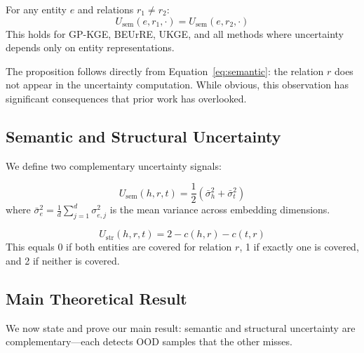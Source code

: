 \begin{proposition}
\label{prop:relation_agnostic}
For any entity $e$ and relations $r_1 \neq r_2$:
\begin{equation}
    U_{\text{sem}}(e, r_1, \cdot) = U_{\text{sem}}(e, r_2, \cdot)
\end{equation}
This holds for GP-KGE, BEUrRE, UKGE, and all methods where uncertainty depends only on entity representations.
\end{proposition}

The proposition follows directly from Equation~\ref{eq:semantic}: the relation $r$ does not appear in the uncertainty computation. While obvious, this observation has significant consequences that prior work has overlooked.

\subsection{Semantic and Structural Uncertainty}

We define two complementary uncertainty signals:

\begin{definition}
\begin{equation}
    U_{\text{sem}}(h,r,t) = \frac{1}{2}(\bar{\sigma}^2_h + \bar{\sigma}^2_t)
\end{equation}
where $\bar{\sigma}^2_e = \frac{1}{d}\sum_{j=1}^d \sigma^2_{e,j}$ is the mean variance across embedding dimensions.
\end{definition}

\begin{definition}
\begin{equation}
    U_{\text{str}}(h,r,t) = 2 - c(h,r) - c(t,r)
\end{equation}
This equals 0 if both entities are covered for relation $r$, 1 if exactly one is covered, and 2 if neither is covered.
\end{definition}

\subsection{Main Theoretical Result}

We now state and prove our main result: semantic and structural uncertainty are complementary---each detects OOD samples that the other misses.

